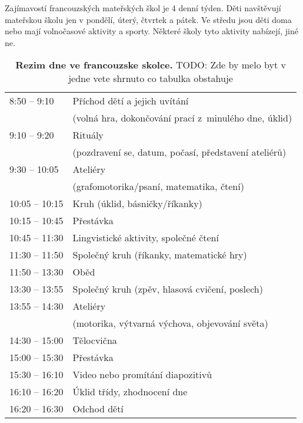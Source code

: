 			Zajímavostí francouzských mateřských škol je 4 denní týden. Děti navštěvují mateřskou školu jen v pondělí, úterý, čtvrtek a pátek. Ve středu jsou děti doma nebo mají volnočasové aktivity a sporty. Některé školy tyto aktivity nabízejí, jiné ne. 

	\begin{spacing}{1.0}
	\begin{table}[]
		\center
		\begin{tabular}{|l l|}
			\hline
			\rowcolor{grey!0}
			8:50 – 9:10 		& Příchod dětí a jejich uvítání 						\\
								& (volná hra, dokončování prací z minulého dne, úklid) 	\\
			9:10 – 9:20			& Rituály 												\\
								& (pozdravení se, datum, počasí, představení ateliérů) 	\\
			9:30 – 10:05		& Ateliéry 												\\
								& (grafomotorika/psaní, matematika, čtení) 				\\
			10:05 – 10:15		& Kruh (úklid, básničky/říkanky) 						\\
			10:15 – 10:45		& Přestávka 											\\
			10:45 – 11:30		& Lingvistické aktivity, společné čtení 				\\
			11:30 – 11:50		& Společný kruh (říkanky, matematické hry) 				\\
			11:50 – 13:30		& Oběd 													\\
			13:30 – 13:55		& Společný kruh (zpěv, hlasová cvičení, poslech) 		\\
			13:55 – 14:30		& Ateliéry 												\\
								&(motorika, výtvarná výchova, objevování světa) 		\\
			14:30 – 15:00		& Tělocvična 											\\
			15:00 – 15:30		& Přestávka 											\\
			15:30 – 16:10		& Video nebo promítání diapozitivů 						\\
			16:10 – 16:20		& Úklid třídy, zhodnocení dne 							\\
			16:20 – 16:30		& Odchod dětí 											\\
			\hline
		\end{tabular}
		\caption{ \textbf{Rezim dne ve francouzske skolce.}
			TODO: Zde by melo byt v jedne vete shrnuto co tabulka obstahuje
		}
		\label{tab:rezimDneFR}
	\end{table}
	\end{spacing}


